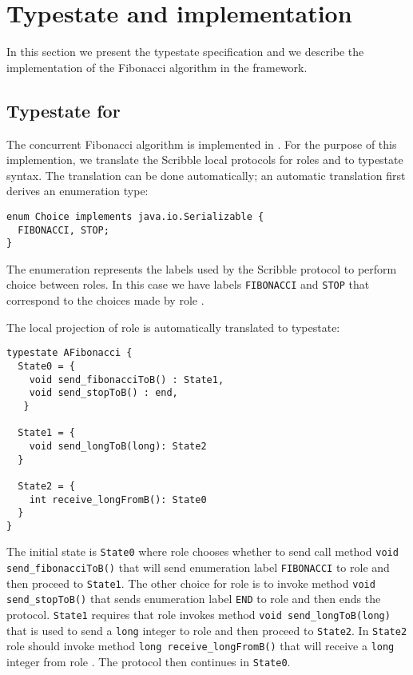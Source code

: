 \section{Typestate and \Mungo implementation}
In this section we present the typestate specification
and we describe the implementation of the Fibonacci
algorithm in the \Mungo framework.

\subsection{Typestate for \Mungo}
\label{sec:typestate}
The concurrent Fibonacci algorithm is implemented in \Mungo.
For the purpose of this implemention,
we translate the Scribble local protocols for roles
\A and \B to \Mungo typestate syntax.
The translation can be done automatically;
an automatic translation first derives an
enumeration type:

\begin{lstlisting}[caption={Enumeration for the communication choice}]
enum Choice implements java.io.Serializable {
  FIBONACCI, STOP;
}
\end{lstlisting}

The enumeration represents the
labels used by the Scribble protocol
to perform choice between roles. In this
case we have labels \lstinline|FIBONACCI| and
\lstinline|STOP| that correspond to the choices
made by role \A.

The local projection of role \A is automatically translated to typestate:

\begin{lstlisting}[caption={Typestate for Role \A}]
typestate AFibonacci {
  State0 = {
    void send_fibonacciToB() : State1,
    void send_stopToB() : end,
   }

  State1 = {
    void send_longToB(long): State2
  }

  State2 = {
    int receive_longFromB(): State0
  }
}
\end{lstlisting}

The initial state is \lstinline|State0| where
role \A chooses whether to send call method
\lstinline|void send_fibonacciToB()| that
will send enumeration label \lstinline|FIBONACCI| to role \B
and then proceed to \lstinline|State1|. The other
choice for role \A is to invoke method
\lstinline|void send_stopToB()| that sends
enumeration label \lstinline|END| to role \B
and then ends the protocol.
\lstinline|State1| requires that role \A invokes
method \lstinline|void send_longToB(long)| that
is used to send a \lstinline|long| integer to role
\B and then proceed to \lstinline|State2|. In 
\lstinline|State2| role \A should invoke method
\lstinline|long receive_longFromB()| that will
receive a \lstinline|long| integer from role \B.
The protocol then continues in \lstinline|State0|.


